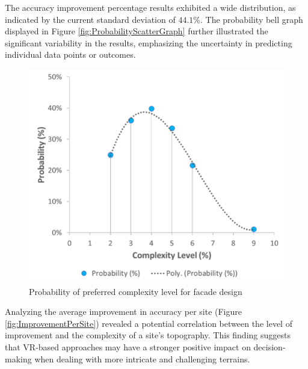 The accuracy improvement percentage results exhibited a wide distribution, as indicated by the current standard deviation of \(44.1\%\).
The probability bell graph displayed in Figure \ref{fig:ProbabilityScatterGraph} further illustrated the significant variability in the results, emphasizing the uncertainty in predicting individual data points or outcomes.


    \begin{figure}[htb]
        \centering
        \includegraphics[width=\linewidth]{Images/ProbabilityPreferredComplexitylevel}
        \caption{Probability of preferred complexity level for facade design}
        \label{fig:ProbabilityComplexitylevelChart}
    \end{figure}

Analyzing the average improvement in accuracy per site (Figure \ref{fig:ImprovementPerSite}) revealed a potential correlation between the level of improvement and the complexity of a site's topography.
This finding suggests that VR-based approaches may have a stronger positive impact on decision-making when dealing with more intricate and challenging terrains.


